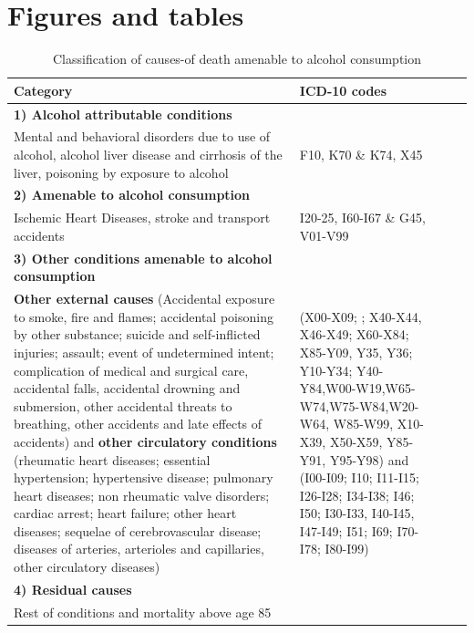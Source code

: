 \documentclass{article}
\begin{document}
\newpage


 

\newpage

\section*{Figures and tables}

\begin{table}[h!]
\caption{Classification of causes-of death amenable to alcohol consumption}
\label{T1}
\begin{center}
 \begin{tabular}{p{10cm}p{6cm}cc}
\hline 
\textbf{Category} & \textbf{ICD-10 codes} \\ 
\hline 
\textbf{1) Alcohol attributable conditions} & \\
Mental and behavioral disorders due to use of alcohol, alcohol liver disease and cirrhosis of the liver, poisoning by exposure to alcohol&F10, K70 \& K74, X45\\
\hline 
\textbf{2) Amenable to alcohol consumption} & \\
Ischemic Heart Diseases, stroke and transport accidents & I20-25, I60-I67 \& G45, V01-V99\\
\hline 
\textbf{3) Other conditions amenable to alcohol consumption} & \\
\textbf{Other external causes} (Accidental exposure to smoke, fire and flames; accidental poisoning by other substance; suicide and self-inflicted injuries; assault; event of undetermined intent; complication of medical and surgical care, accidental falls, accidental drowning and submersion, other accidental threats to breathing, other accidents and late effects of accidents) and \textbf{other circulatory conditions} (rheumatic heart diseases; essential hypertension; hypertensive disease; pulmonary heart diseases; non rheumatic valve disorders; cardiac arrest; heart failure; other heart diseases; sequelae of cerebrovascular disease; diseases of arteries, arterioles and capillaries, other circulatory diseases)  &  (X00-X09; ; X40-X44, X46-X49; X60-X84; X85-Y09, Y35, Y36; Y10-Y34; Y40-Y84,W00-W19,W65-W74,W75-W84,W20-W64, W85-W99, X10-X39, X50-X59, Y85-Y91, Y95-Y98) and (I00-I09; I10; I11-I15; I26-I28; I34-I38; I46; I50; I30-I33, I40-I45, I47-I49; I51; I69; I70-I78; I80-I99)\\
\hline 
\textbf{4) Residual causes} & \\
Rest of conditions and mortality above age 85  &\\
\hline 
\end{tabular} 
\end{center}
\end{table}
\end{document}
